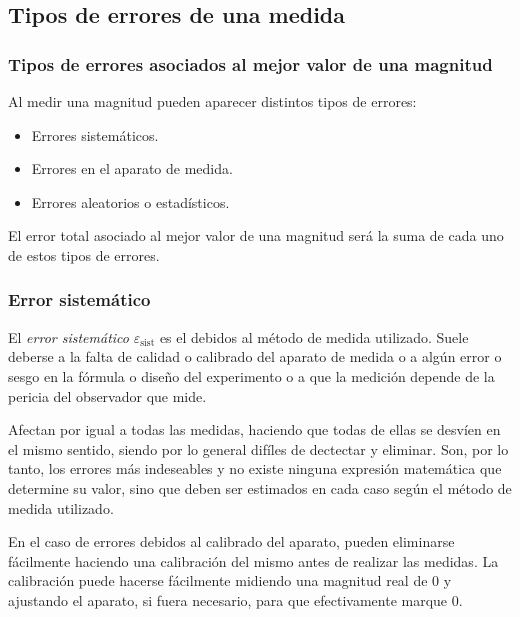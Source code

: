 \subsection{Tipos de errores de una medida}
\begin{frame}
	\frametitle{Tipos de errores asociados al mejor valor de una magnitud}
	Al medir una magnitud pueden aparecer distintos tipos de errores:
	\begin{itemize}
		\item Errores sistemáticos.
		\item Errores en el aparato de medida.
		\item Errores aleatorios o estadísticos.
	\end{itemize}
	El error total asociado al mejor valor de una magnitud será la suma de cada uno de estos tipos de errores. 
\end{frame}


\begin{frame}
	\frametitle{Error sistemático}
	El \emph{error sistemático} $\varepsilon_{\textrm{sist}}$ es el debidos al método de medida utilizado. Suele
	deberse a la falta de calidad o calibrado del aparato de medida o a algún error o sesgo en la fórmula o diseño del
	experimento o a que la medición depende de la pericia del observador que mide.
	
	Afectan por igual a todas las medidas, haciendo que todas de ellas se desvíen en el mismo sentido, siendo por lo
	general difíles de dectectar y eliminar. Son, por lo tanto, los errores más indeseables y no existe ninguna expresión
	matemática que determine su valor, sino que deben ser estimados en cada caso según el método de medida utilizado.
	
	En el caso de errores debidos al calibrado del aparato, pueden eliminarse fácilmente haciendo una calibración del mismo
	antes de realizar las medidas. La calibración puede hacerse fácilmente midiendo una magnitud real de 0 y ajustando el
	aparato, si fuera necesario, para que efectivamente marque 0. 
\end{frame}


